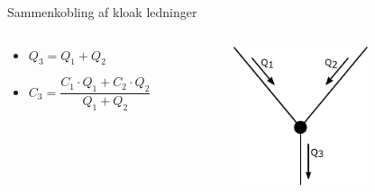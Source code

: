 \begin{frame}{Sammenkobling af kloak ledninger}{}
\vfill\vfill\centering
	\begin{columns}
	\begin{column}{0.4\textwidth}
		\begin{itemize}
			\vspace{9mm}
			\item<1-> $Q_3 = Q_1 + Q_2$
			\vspace{9mm}
			\item<2-> $C_3 = \dfrac{C_1 \cdot Q_1 + C_2 \cdot Q_2}{Q_1 + Q_2}$
		\end{itemize}
	\end{column}

	\begin{column}{0.48\textwidth}
		\begin{figure}[H]
			\centering
			\includegraphics[width=0.7\textwidth]{Sections/pictures/interconnections.pdf}
		\end{figure}
	\end{column}
\end{columns}
\vfill\vfill		
\end{frame}

